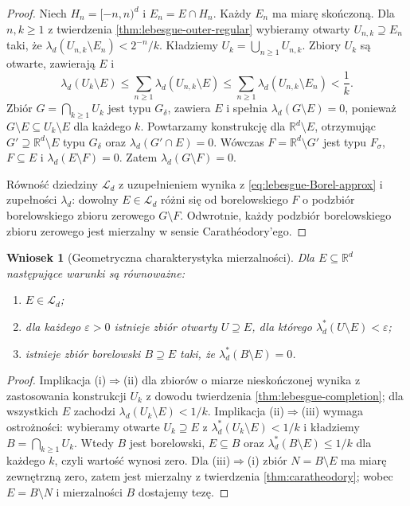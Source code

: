 \documentclass[11pt,a4paper,oneside]{book}
\numberwithin{equation}{chapter}
\theoremstyle{plain}
\newtheorem{wniosek}[twierdzenie]{Wniosek}
\theoremstyle{definition}
\theoremstyle{remark}
\begin{document}
\begin{proof}
Niech $H_n=[-n,n)^d$ i $E_n=E\cap H_n$.
Każdy $E_n$ ma miarę skończoną.
Dla $n,k\ge1$ z twierdzenia
\ref{thm:lebesgue-outer-regular} wybieramy
otwarty $U_{n,k}\supseteq E_n$ taki, że
$\lambda_d(U_{n,k}\setminus E_n)<2^{-n}/k$.
Kładziemy $U_k=\bigcup_{n\ge1}U_{n,k}$.
Zbiory $U_k$ są otwarte, zawierają $E$ i
\[
\lambda_d(U_k\setminus E)
\le\sum_{n\ge1}\lambda_d(U_{n,k}\setminus E)
\le\sum_{n\ge1}\lambda_d(U_{n,k}\setminus E_n)
<\frac1k.
\]
Zbiór $G=\bigcap_{k\ge1}U_k$ jest typu $G_\delta$,
zawiera $E$ i spełnia $\lambda_d(G\setminus E)=0$,
ponieważ $G\setminus E\subseteq U_k\setminus E$
dla każdego $k$.
Powtarzamy konstrukcję dla $\mathbb R^d\setminus E$,
otrzymując $G'\supseteq\mathbb R^d\setminus E$ typu
$G_\delta$ oraz $\lambda_d(G'\cap E)=0$.
Wówczas $F=\mathbb R^d\setminus G'$ jest typu
$F_\sigma$, $F\subseteq E$ i
$\lambda_d(E\setminus F)=0$. Zatem
$\lambda_d(G\setminus F)=0$.

Równość dziedziny $\mathcal L_d$ z uzupełnieniem
wynika z \eqref{eq:lebesgue-Borel-approx} i
zupełności $\lambda_d$: dowolny $E\in\mathcal L_d$
różni się od borelowskiego $F$ o podzbiór borelowskiego
zbioru zerowego $G\setminus F$. Odwrotnie, każdy
podzbiór borelowskiego zbioru zerowego jest
mierzalny w sensie Carathéodory'ego.
\end{proof}

\begin{wniosek}[Geometryczna charakterystyka mierzalności]
\label{cor:lebesgue-regularity-characterization}
Dla $E\subseteq\mathbb R^d$ następujące warunki
są równoważne:
\begin{enumerate}[label=\textup{(\roman*)}]
\item $E\in\mathcal L_d$;
\item dla każdego $\varepsilon>0$ istnieje zbiór
otwarty $U\supseteq E$, dla którego
$\lambda_d^*(U\setminus E)<\varepsilon$;
\item istnieje zbiór borelowski $B\supseteq E$
taki, że $\lambda_d^*(B\setminus E)=0$.
\end{enumerate}
\end{wniosek}

\begin{proof}
Implikacja (i)$\Rightarrow$(ii) dla zbiorów o miarze
nieskończonej wynika z zastosowania konstrukcji
$U_k$ z dowodu twierdzenia
\ref{thm:lebesgue-completion}; dla wszystkich $E$
zachodzi $\lambda_d(U_k\setminus E)<1/k$.
Implikacja (ii)$\Rightarrow$(iii) wymaga ostrożności:
wybieramy otwarte $U_k\supseteq E$ z
$\lambda_d^*(U_k\setminus E)<1/k$ i kładziemy
$B=\bigcap_{k\ge1}U_k$. Wtedy $B$ jest borelowski,
$E\subseteq B$ oraz
$\lambda_d^*(B\setminus E)\le1/k$ dla każdego $k$,
czyli wartość wynosi zero.
Dla (iii)$\Rightarrow$(i) zbiór $N=B\setminus E$
ma miarę zewnętrzną zero, zatem jest mierzalny
z twierdzenia \ref{thm:caratheodory}; wobec
$E=B\setminus N$ i mierzalności $B$ dostajemy tezę.
\end{proof}
\end{document}
